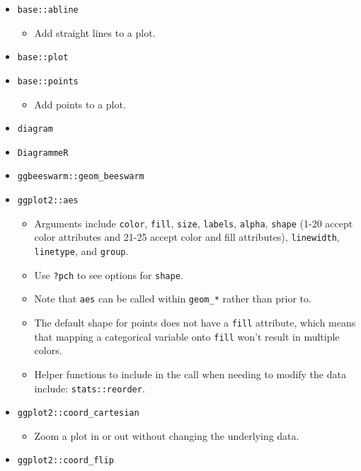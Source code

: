 \documentclass[
]{book}
\providecommand{\tightlist}{%
  \setlength{\itemsep}{0pt}\setlength{\parskip}{0pt}}
\begin{document}
\begin{itemize}
\tightlist
\item
  \texttt{base::abline}

  \begin{itemize}
  \tightlist
  \item
    Add straight lines to a plot.
  \end{itemize}
\item
  \texttt{base::plot}
\item
  \texttt{base::points}

  \begin{itemize}
  \tightlist
  \item
    Add points to a plot.
  \end{itemize}
\item
  \texttt{diagram}
\item
  \texttt{DiagrammeR}
\item
  \texttt{ggbeeswarm::geom\_beeswarm}
\item
  \texttt{ggplot2::aes}

  \begin{itemize}
  \tightlist
  \item
    Arguments include \texttt{color}, \texttt{fill}, \texttt{size}, \texttt{labels}, \texttt{alpha}, \texttt{shape} (1-20 accept color attributes and 21-25 accept color and fill attributes), \texttt{linewidth}, \texttt{linetype}, and \texttt{group}.
  \item
    Use \texttt{?pch} to see options for \texttt{shape}.
  \item
    Note that \texttt{aes} can be called within \texttt{geom\_*} rather than prior to.
  \item
    The default shape for points does not have a \texttt{fill} attribute, which means that mapping a categorical variable onto \texttt{fill} won't result in multiple colors.
  \item
    Helper functions to include in the call when needing to modify the data include: \texttt{stats::reorder}.
  \end{itemize}
\item
  \texttt{ggplot2::coord\_cartesian}

  \begin{itemize}
  \tightlist
  \item
    Zoom a plot in or out without changing the underlying data.
  \end{itemize}
\item
  \texttt{ggplot2::coord\_flip}


\end{itemize}
\end{document}
